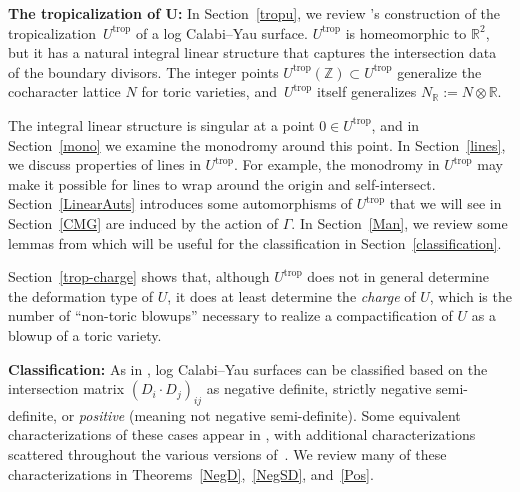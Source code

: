\documentclass[pdftex]{sigma}
\numberwithin{equation}{section}
\numberwithin{figure}{section}
\numberwithin{table}{section}
\DeclareMathOperator{\trop}{trop}
\let\bb=\mathbb
\theoremstyle{definition}
\begin{document}
{\bf The tropicalization of $\boldsymbol{U}$:} In Section~\ref{tropu}, we review \cite{GHK1}'s construction of the tropicaliza\-tion~$U^{\trop}$ of a log Calabi--Yau surface. $U^{\trop}$ is homeomorphic to $\bb{R}^2$, but it has a natural integral linear structure that captures the intersection data of the boundary divisors. The integer points $U^{\trop}(\bb{Z})\subset U^{\trop}$ generalize the cocharacter lattice $N$ for toric varieties, and~$U^{\trop}$ itself generalizes $N_{\bb{R}}:=N\otimes \bb{R}$.

The integral linear structure is singular at a point $0\in U^{\trop}$, and in Section~\ref{mono} we examine the monodromy around this point. In Section~\ref{lines}, we discuss properties of lines in $U^{\trop}$. For example, the monodromy in $U^{\trop}$ may make it possible for lines to wrap around the origin and self-intersect. Section~\ref{LinearAuts} introduces some automorphisms of $U^{\trop}$ that we will see in Section~\ref{CMG} are induced by the action of $\Gamma$. In Section~\ref{Man}, we review some lemmas from \cite{Man1} which will be useful for the classification in Section~\ref{classification}.

Section~\ref{trop-charge} shows that, although $U^{\trop}$ does not in general determine the deformation type of $U$, it does at least determine the {\it charge} of $U$, which is the number of ``non-toric blowups'' necessary to realize a compactification of $U$ as a blowup of a toric variety.

{\bf Classification:} As in \cite{GHK1, GHK2}, log Calabi--Yau surfaces can be classified based on the intersection matrix $(D_i\cdot D_j)_{ij}$ as negative definite, strictly negative semi-definite, or \textit{positive} (meaning not negative semi-definite). Some equivalent characterizations of these cases appear in \cite[Lem\-ma~6.9]{GHK1}, with additional characterizations scattered throughout the various versions of~\cite{GHK1, GHK2}. We review many of these characterizations in Theorems~\ref{NegD},~\ref{NegSD}, and~\ref{Pos}.
\end{document}

